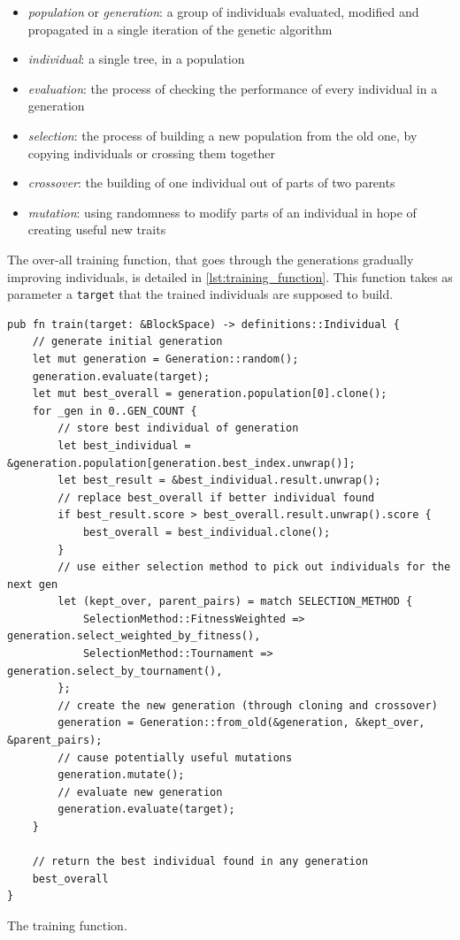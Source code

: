 \documentclass{report}
\newenvironment{code}{\captionsetup{type=listing}}{}
\begin{document}
\begin{itemize}
    \item \emph{population} or \emph{generation}: a group of individuals evaluated, modified and propagated in a single iteration of the genetic algorithm
    \item \emph{individual}: a single tree, in a population
    \item \emph{evaluation}: the process of checking the performance of every individual in a generation
    \item \emph{selection}: the process of building a new population from the old one, by copying individuals or crossing them together
    \item \emph{crossover}: the building of one individual out of parts of two parents
    \item \emph{mutation}: using randomness to modify parts of an individual in hope of creating useful new traits
\end{itemize}

The over-all training function, that goes through the generations gradually improving individuals, is detailed in \autoref{lst:training_function}. This function takes as parameter a \verb|target| that the trained individuals are supposed to build.

\begin{code}
    \begin{verbatim}
pub fn train(target: &BlockSpace) -> definitions::Individual {
    // generate initial generation
    let mut generation = Generation::random();
    generation.evaluate(target);
    let mut best_overall = generation.population[0].clone();
    for _gen in 0..GEN_COUNT {
        // store best individual of generation
        let best_individual = &generation.population[generation.best_index.unwrap()];
        let best_result = &best_individual.result.unwrap();
        // replace best_overall if better individual found
        if best_result.score > best_overall.result.unwrap().score {
            best_overall = best_individual.clone();
        }
        // use either selection method to pick out individuals for the next gen
        let (kept_over, parent_pairs) = match SELECTION_METHOD {
            SelectionMethod::FitnessWeighted => generation.select_weighted_by_fitness(),
            SelectionMethod::Tournament => generation.select_by_tournament(),
        };
        // create the new generation (through cloning and crossover)
        generation = Generation::from_old(&generation, &kept_over, &parent_pairs);
        // cause potentially useful mutations
        generation.mutate();
        // evaluate new generation
        generation.evaluate(target);
    }

    // return the best individual found in any generation
    best_overall
}
    \end{verbatim}
    \caption{The training function.}
    \label{lst:training_function}
\end{code}
\end{document}
